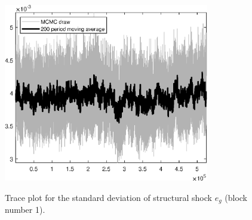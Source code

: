 \begin{figure}[H]
\centering
  \includegraphics[width=0.8\textwidth]{BRS_growth_KPR/graphs/TracePlot_SE_e_g_blck_1}\\
    \caption{Trace plot for the standard deviation of structural shock ${e_g}$ (block number 1).}
\end{figure}
